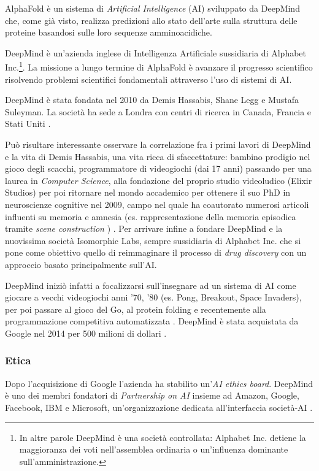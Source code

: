 {
	AlphaFold è un sistema di \textit{Artificial Intelligence }(AI) sviluppato da DeepMind che, come già visto, realizza predizioni allo stato dell'arte sulla struttura delle proteine basandosi sulle loro sequenze amminoacidiche.
	
	\par DeepMind è un'azienda inglese di Intelligenza Artificiale sussidiaria di Alphabet Inc.\footnote{In altre parole DeepMind è una società controllata: Alphabet Inc. detiene la maggioranza dei voti nell'assemblea ordinaria o un'influenza dominante sull'amministrazione.}. La missione a lungo termine di AlphaFold è avanzare il progresso scientifico risolvendo problemi scientifici fondamentali attraverso l'uso di sistemi di AI.
	
	\par DeepMind è stata fondata nel 2010 da Demis Hassabis, Shane Legg e Mustafa Suleyman. La società ha sede a Londra con centri di ricerca in Canada, Francia e Stati Uniti \supercite{deepMindWiki}.
	
	\par Può risultare interessante osservare la correlazione fra i primi lavori di DeepMind e la vita di Demis Hassabis, una vita ricca di sfaccettature: bambino prodigio nel gioco degli scacchi, programmatore di videogiochi (dai 17 anni) passando per una laurea in \textit{Computer Science}, alla fondazione del proprio studio videoludico (Elixir Studios) per poi ritornare nel mondo accademico per ottenere il suo PhD in neuroscienze cognitive nel 2009, campo nel quale ha coautorato numerosi articoli influenti su memoria e amnesia (es. rappresentazione della memoria episodica tramite \textit{scene construction} \supercite{Hassabis2007Jul}) \supercite{hassabisWiki}. Per arrivare infine a fondare DeepMind e la nuovissima società Isomorphic Labs, sempre sussidiaria di Alphabet Inc. che si pone come obiettivo quello di reimmaginare il processo di \textit{drug discovery} con un approccio basato principalmente sull'AI.
	
	\par DeepMind iniziò infatti a focalizzarsi sull'insegnare ad un sistema di AI come giocare a vecchi videogiochi anni '70, '80 (es. Pong, Breakout, Space Invaders), per poi passare al gioco del Go, al protein folding e recentemente alla programmazione competitiva automatizzata \supercite{competitiveProgrDeepMind}.
	DeepMind è stata acquistata da Google nel 2014 per 500 milioni di dollari \supercite{Guardian2014}.
	
	\subsubsection{Etica}
	Dopo l'acquisizione di Google l'azienda ha stabilito un'\textit{AI ethics board}. DeepMind è uno dei membri fondatori di \textit{Partnership on AI} insieme ad Amazon, Google, Facebook, IBM e Microsoft, un'organizzazione dedicata all'interfaccia società-AI \supercite{partnershiponai}.
	
}
